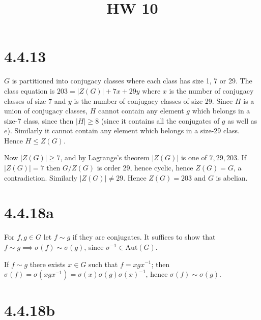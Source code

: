 \documentclass{article}
\title{HW 10}
\date{}
\def\inv{{-1}}
\def\Aut{\textrm{Aut}}
\begin{document}
\maketitle






\section*{4.4.13}

$G$ is partitioned into conjugacy classes where each class has size 1, 7 or 29. The class equation is $203 = |Z(G)| + 7x + 29y$ where $x$ is the number of conjugacy classes of size 7 and $y$ is the number of conjugacy classes of size 29. Since $H$ is a union of conjugacy classes, $H$ cannot contain any element $g$ which belongs in a size-7 class, since then $|H| \ge 8$ (since it contains all the conjugates of $g$ as well as $e$). Similarly it cannot contain any element which belongs in a size-29 class. Hence $H \le Z(G)$.

Now $|Z(G)| \ge 7$, and by Lagrange's theorem $|Z(G)|$ is one of $7, 29, 203$. If $|Z(G)| = 7$ then $G / Z(G)$ is order 29, hence cyclic, hence $Z(G) = G$, a contradiction. Similarly $|Z(G)| \ne 29$. Hence $Z(G) = 203$ and $G$ is abelian.

\section*{4.4.18a}

For $f, g \in G$ let $f \sim g$ if they are conjugates. It suffices to show that $f \sim g \implies \sigma(f) \sim \sigma(g)$, since $\sigma^\inv \in \Aut(G)$.

If $f \sim g$ there exists $x \in G$ such that $f = xgx^\inv$; then $\sigma(f) = \sigma(xgx^\inv) = \sigma(x)\sigma(g)\sigma(x)^\inv$, hence $\sigma(f) \sim \sigma(g)$.

\section*{4.4.18b}
\end{document}
